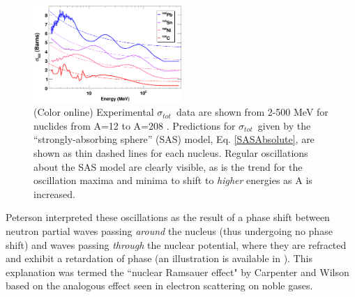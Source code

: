 \documentclass[twocolumn,secnumarabic,amssymb, nobibnotes, aps, prl,
superscriptaddress, nobalancelastpage]{revtex4}
\newcommand{\tot}{\ensuremath{\sigma_{tot}}}
\begin{document}
\begin{figure}
    \includegraphics[width=0.5\textwidth]{figures/ExampleTCS.png}
    \caption{
        (Color online) Experimental \tot\ data are shown from 2-500
        MeV for nuclides from A=12 to A=208
        \cite{Finlay1993, Schwartz1974, Poenitz1983, Abfalterer2000, Abfalterer2001}.
        Predictions for \tot\ given by the ``strongly-absorbing sphere'' (SAS)
        model, Eq. \ref{SASAbsolute}, are shown as thin dashed lines for each nucleus.
        Regular oscillations about the SAS model are clearly visible,
        as is the trend for the oscillation
        maxima and minima to shift to \textit{higher} energies as A is increased.
    }
    \label{SASphereVsExperiment}
\end{figure}
Peterson \cite{Peterson1962} interpreted these oscillations as the 
result of a phase shift between neutron partial waves passing \textit{around} the 
nucleus (thus undergoing no phase shift) and waves passing
\textit{through} the nuclear potential, where they are refracted and exhibit a 
retardation of phase (an illustration is available in \cite{Satchler1980}).
This explanation was termed the 
``nuclear Ramsauer effect" by Carpenter and Wilson \cite{Carpenter1959} based on 
the analogous effect seen in electron scattering on noble gases.
\end{document}
